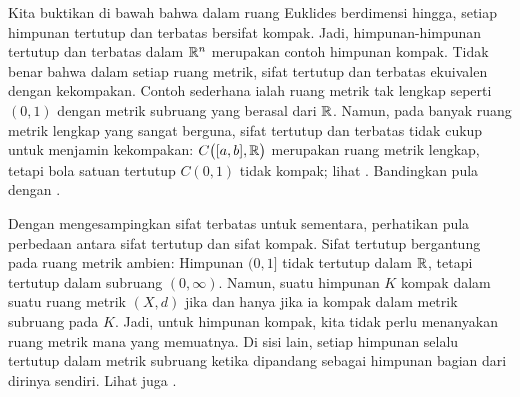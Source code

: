 \begin{myfigureht}
\caption{Pembuktian bahwa himpunan kompak bersifat terbatas (kiri) dan tertutup (kanan).\label{fig:compactbndclosed}}
\end{myfigureht}

Kita buktikan di bawah bahwa 
dalam ruang Euklides berdimensi hingga,
setiap himpunan tertutup dan terbatas bersifat kompak.
Jadi, himpunan-himpunan tertutup dan terbatas
dalam ${\mathbb{R}}^n$ merupakan contoh himpunan kompak.
Tidak benar bahwa dalam setiap ruang metrik, sifat tertutup dan terbatas ekuivalen
dengan kekompakan.  Contoh sederhana ialah ruang metrik tak lengkap seperti
$(0,1)$ dengan metrik subruang yang berasal dari ${\mathbb{R}}$.
Namun, pada banyak ruang metrik lengkap yang sangat berguna,
sifat tertutup dan terbatas tidak
cukup untuk menjamin kekompakan: $C\bigl([a,b],{\mathbb{R}}\bigr)$ merupakan ruang metrik
lengkap, tetapi bola satuan tertutup $C(0,1)$ tidak kompak; lihat
.  Bandingkan pula dengan
.

Dengan mengesampingkan sifat terbatas untuk sementara,
perhatikan pula perbedaan antara sifat tertutup dan sifat kompak.  Sifat
tertutup bergantung pada ruang metrik ambien:
Himpunan $(0,1]$ tidak tertutup dalam ${\mathbb{R}}$,
tetapi tertutup dalam subruang $(0,\infty)$.
Namun, suatu himpunan $K$ kompak
dalam suatu ruang metrik $(X,d)$ jika dan hanya jika ia kompak dalam metrik
subruang pada $K$.  Jadi, untuk himpunan kompak, kita tidak perlu menanyakan
ruang metrik mana yang memuatnya.
Di sisi lain, setiap himpunan selalu tertutup dalam 
metrik subruang ketika dipandang sebagai himpunan bagian dari dirinya sendiri.
Lihat juga .


